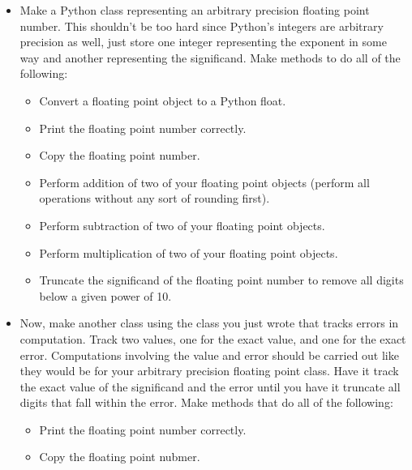 \begin{problem}
\begin{itemize}

\item Make a Python class representing an arbitrary precision floating point number.
This shouldn't be too hard since Python's integers are arbitrary precision as well, just store one integer representing the exponent in some way and another representing the significand.
Make methods to do all of the following:
	\begin{itemize}

	\item Convert a floating point object to a Python float.

	\item Print the floating point number correctly.

	\item Copy the floating point number.

	\item Perform addition of two of your floating point objects (perform all operations without any sort of rounding first).

	\item Perform subtraction of two of your floating point objects.

	\item Perform multiplication of two of your floating point objects.

	\item Truncate the significand of the floating point number to remove all digits below a given power of 10.

	\end{itemize}

\item Now, make another class using the class you just wrote that tracks errors in computation.
Track two values, one for the exact value, and one for the exact error.
Computations involving the value and error should be carried out like they would be for your arbitrary precision floating point class.
Have it track the exact value of the significand and the error until you have it truncate all digits that fall within the error.
Make methods that do all of the following:
	\begin{itemize}

	\item Print the floating point number correctly.

	\item Copy the floating point nubmer.


\end{itemize}
\end{itemize}
\end{problem}

